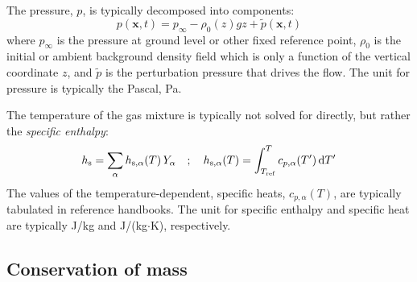 \documentclass[graybox]{svmult}
\begin{document}
The pressure, $p$, is typically decomposed into components:
\begin{equation}
   p(\mathbf{x},t) = p_\infty - \rho_0(z) g z + \tilde{p}(\mathbf{x},t)
\end{equation}
where $p_\infty$ is the pressure at ground level or other fixed reference point, $\rho_0$ is the initial or ambient background density field which is only a function of the vertical coordinate $z$, and $\tilde{p}$ is the perturbation pressure that drives the flow. The unit for pressure is typically the Pascal, Pa.

The temperature of the gas mixture is typically not solved for directly, but rather the {\em specific enthalpy}:
\begin{equation}
  h_{\rm s} = \sum_\alpha h_{{\rm s},\alpha}(T) \, Y_\alpha \quad ; \quad h_{{\rm s},\alpha}(T) = \int_{T_{\rm ref}}^T c_{p,\alpha}(T') \, \mbox{d}T'
\end{equation}
The values of the temperature-dependent, specific heats, $c_{p,\alpha}(T)$, are typically tabulated in reference handbooks. The unit for specific enthalpy and specific heat are typically J/kg and J/(kg$\cdot$K), respectively.



\subsection{Conservation of mass}
\end{document}
